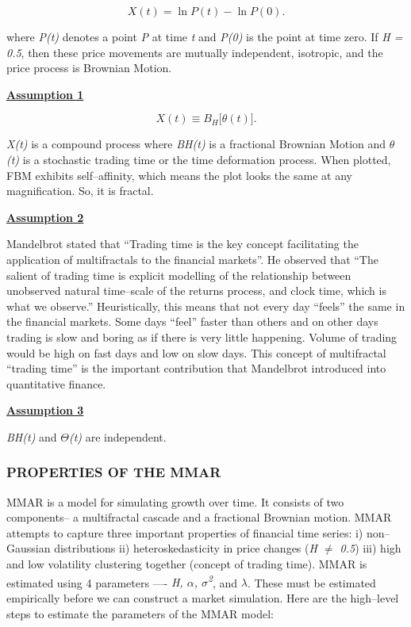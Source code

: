 \documentclass[12pt,a4paper]{report}
\numberwithin{equation}{section}
\begin{document}
\begin{equation}
X(t) = \ln P(t) - \ln P(0).
\label{eq:log-price-increment}
\end{equation}


where \emph{P(t)} denotes a point \emph{P} at time \emph{t} and
\emph{P(0)} is the point at time zero. If \emph{H = 0.5}, then these
price movements are mutually independent, isotropic, and the price
process is Brownian Motion.

\textbf{\uline{Assumption 1}}

\begin{equation}
X(t) \equiv B_H\!\bigl[\theta(t)\bigr].
\label{eq:subordination}
\end{equation}


\emph{X(t)} is a compound process where \emph{BH(t)} is a fractional
Brownian Motion and \emph{$\theta$(t)} is a stochastic trading time or the time
deformation process. When plotted, FBM exhibits self--affinity, which
means the plot looks the same at any magnification. So, it is fractal.

\textbf{\uline{Assumption 2}}

Mandelbrot stated that ``Trading time is the key concept facilitating
the application of multifractals to the financial markets''. He observed
that ``The salient of trading time is explicit modelling of the
relationship between unobserved natural time--scale of the returns
process, and clock time, which is what we observe.'' Heuristically, this
means that not every day ``feels'' the same in the financial markets.
Some days ``feel'' faster than others and on other days trading is slow
and boring as if there is very little happening. Volume of trading would
be high on fast days and low on slow days. This concept of multifractal
``trading time'' is the important contribution that Mandelbrot
introduced into quantitative finance.

\textbf{\uline{Assumption 3}}

\emph{BH(t)} and \emph{$\Theta$(t)} are independent.

\hypertarget{properties--of--the--mmar}{%
\subsubsection{PROPERTIES OF THE MMAR}\label{properties--of--the--mmar}}

MMAR is a model for simulating growth over time. It consists of two
components-- a multifractal cascade and a fractional Brownian motion.
MMAR attempts to capture three important properties of financial time
series: i) non--Gaussian distributions ii) heteroskedasticity in price
changes (\emph{H $\neq$ 0.5}) iii) high and low volatility clustering
together (concept of trading time). MMAR is estimated using 4 parameters
---- \emph{H, $\alpha$, $\sigma$\textsuperscript{2}}, and \emph{$\lambda$}. These must be
estimated empirically before we can construct a market simulation. Here
are the high--level steps to estimate the parameters of the MMAR model:
\end{document}
